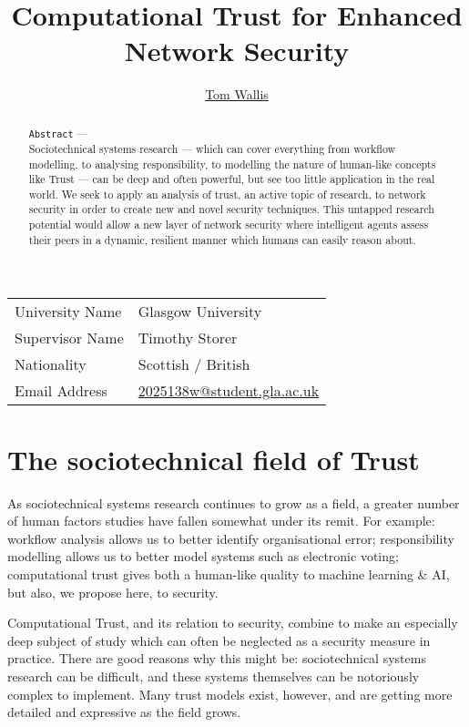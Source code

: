 \documentclass{tufte-handout}
\title{Computational Trust for Enhanced Network Security}
\author[Tom Wallis]{\href{http://tomwallis.net}{Tom Wallis}}
\date{}  %
\begin{document}
\maketitle%

\bigskip

\begin{tabular}{l l}
    University Name & Glasgow University\\
    Supervisor Name & Timothy Storer \\
    Nationality & Scottish / British \\
    Email Address & \href{mailto:2025138w@student.gla.ac.uk}{2025138w@student.gla.ac.uk} \\
\end{tabular}

\bigskip

\begin{abstract}
\texttt{Abstract} ---\\
Sociotechnical systems research --- which can cover everything from workflow modelling, to analysing responsibility, to modelling the nature of human-like concepts like Trust --- can be deep and often powerful, but see too little application in the real world. We seek to apply an analysis of trust, an active topic of research, to network security in order to create new and novel security techniques. This untapped research potential would allow a new layer of network security where intelligent agents assess their peers in a dynamic, resilient manner which humans can easily reason about.
\end{abstract}

\newpage

\section{The sociotechnical field of Trust}
As sociotechnical systems research continues to grow as a field, a greater number of human factors studies have fallen somewhat under its remit. For example: workflow analysis allows us to better identify organisational error; responsibility modelling allows us to better model systems such as electronic voting; computational trust gives both a human-like quality to machine learning \& AI, but also, we propose here, to security.\par

Computational Trust, and its relation to security, combine to make an especially deep subject of study which can often be neglected as a security measure in practice. There are good reasons why this might be: sociotechnical systems research can be difficult, and these systems themselves can be notoriously complex to implement.\cite{Crabtree2000} Many trust models exist, however, and are getting more detailed and expressive as the field grows.\par
\end{document}
